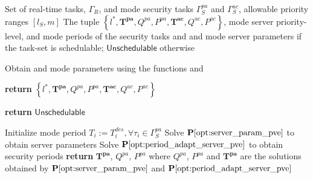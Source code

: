 \documentclass[../rt_server_main.tex]{subfiles}
\begin{document}
		\begin{algorithm}[!ht]
  \footnotesize
			\begin{algorithmic}[1]
				\REQUIRE Set of real-time tasks, $\Gamma_R$, \pve and 
               \ave mode security tasks $\Gamma_S^{pa}$ and $\Gamma_S^{ac}$, allowable priority ranges $[l_S,m]$
    \ENSURE The tuple $\left\lbrace l^*, \mathbf{T}^{\boldsymbol{pa}}, Q^{pa}, P^{pa},  \mathbf{T}^{\boldsymbol{ac}}, Q^{ac}, P^{ac} \right\rbrace$, \eg \ave mode server priority-level,  \ave and \pve mode periods of the security tasks and \ave and \pve mode server parameters if the task-set is schedulable; $\mathsf{Unschedulable}$	 otherwise	
					\vspace{0.4em}
                   	
				
                
                \STATE Obtain \pve and \ave mode parameters using the functions {} and {}
             
                    \STATE  {}
                    \STATE \textbf{return} $\left\lbrace l^*, \mathbf{T}^{\boldsymbol{pa}}, Q^{pa}, P^{pa},  \mathbf{T}^{\boldsymbol{ac}}, Q^{ac}, P^{ac} \right\rbrace$
                     
                    \ELSE
\STATE {}	                   \STATE \textbf{return} $\mathsf{Unschedulable}$  
                    \ENDIF
         \\\hrulefill           
                \vspace*{0.5em}
              \STATE {}
              
               \begin{ALC@g}
        \STATE Initialize \pve mode period $T_i := T_i^{des}, \forall \tau_i \in \Gamma_S^{pa}$ 
        	\STATE Solve $\mathbf{P}\mathbf{\ref{opt:server_param_pve}}$ to obtain server parameters
                    \STATE Solve $\mathbf{P}\mathbf{\ref{opt:period_adapt_server_pve}}$ to obtain security periods
                    \STATE  {}
                    \STATE \textbf{return} $\mathbf{T}^{\boldsymbol{pa}}$, $Q^{pa}$, $P^{pa}$ where $Q^{pa}$, $P^{pa}$ and $\mathbf{T}^{\boldsymbol{pa}}$  are the solutions obtained by $\mathbf{P}\mathbf{\ref{opt:server_param_pve}}$ and $\mathbf{P}\mathbf{\ref{opt:period_adapt_server_pve}}$
                     

\end{ALC@g}
\end{algorithmic}
\end{algorithm}
\end{document}
